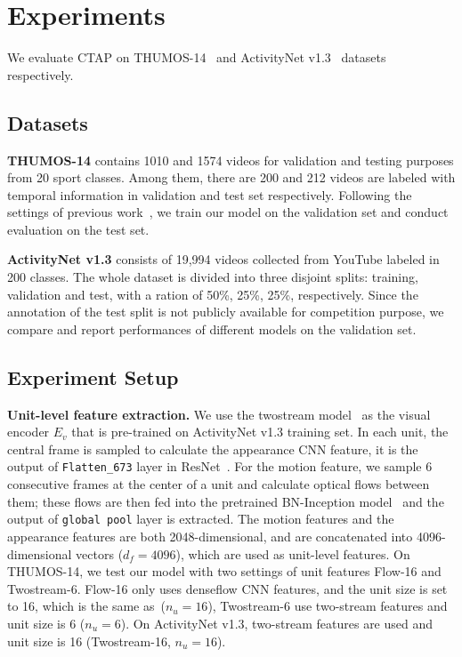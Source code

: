 \documentclass[runningheads]{llncs}
\begin{document}
\section{Experiments}\label{sec: exp}
We evaluate CTAP on THUMOS-14~\cite{THUMOS14} and ActivityNet v1.3~\cite{caba2015activitynet} datasets respectively.

\setlength{\parindent}{0pt}
\subsection{Datasets}

\textbf{THUMOS-14} contains 1010 and 1574 videos for validation and testing purposes from 20 sport classes. 
Among them, there are 200 and 212 videos are labeled with temporal information in validation and test set respectively. 
Following the settings of previous work~\cite{Gao_2017_ICCV,Shou_2016_CVPR}, we train our model on the validation set and conduct evaluation on the test set. 

\textbf{ActivityNet v1.3} consists of 19,994 videos collected from YouTube labeled in 200 classes. 
The whole dataset is divided into three disjoint splits: training, validation and test, with a ration of 50\%, 25\%, 25\%, respectively. 
Since the annotation of the test split is not publicly available for competition purpose, we compare and report performances of different models on the validation set. 

\subsection{Experiment Setup}\label{ssec: exp setup}
\textbf{Unit-level feature extraction.} We use the twostream model~\cite{xiong2016cuhk} as the visual encoder $E_v$ that is pre-trained on ActivityNet v1.3 training set. In each unit, the central frame is sampled to calculate the appearance CNN feature, it is the output of \texttt{Flatten\_673} layer in ResNet~\cite{He_2016_CVPR}. For the motion feature, we sample 6 consecutive frames at the center of a unit and calculate optical flows between them; these flows are then fed into the pretrained BN-Inception model~\cite{ioffe2015batch} and the output of \texttt{global pool} layer is extracted. The motion features and the appearance features are both 2048-dimensional, and are concatenated into 4096-dimensional vectors ($d_f=4096$), which are used as unit-level features. On THUMOS-14, we test our model with two settings of unit features Flow-16 and Twostream-6. Flow-16 only uses denseflow CNN features, and the unit size is set to 16, which is the same as~\cite{Gao_2017_ICCV}($n_u=16$), Twostream-6 use two-stream features and unit size is 6 ($n_u=6$). On ActivityNet v1.3, two-stream features are used and unit size is 16 (Twostream-16, $n_u=16$).
\end{document}
